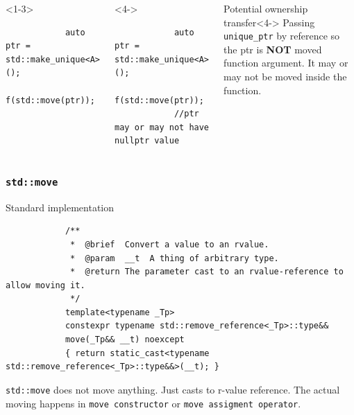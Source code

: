\documentclass{beamer}
\begin{document}
\begin{frame}[fragile,t]
\begin{columns}[T]
        \hrulefill
        \begin{onlyenv}<1-3>
        \begin{lstlisting}
            auto ptr = std::make_unique<A>();
            f(std::move(ptr));
		\end{lstlisting}
        \end{onlyenv}

        \begin{onlyenv}<4->
        \begin{lstlisting}
            auto ptr = std::make_unique<A>();
            f(std::move(ptr));
            //ptr may or may not have nullptr value
		\end{lstlisting}
        \end{onlyenv}

        \begin{block}{Potential ownership transfer}<4->
            Passing \texttt{unique\_ptr} by reference so the ptr is \textbf{NOT} moved function argument.
            It may or may not be moved inside the function.
        \end{block}
	\end{columns}


\end{frame}

\begin{frame}[fragile,t]
\frametitle{\texttt{std::move}}
    \begin{block}{Standard implementation}
        \begin{lstlisting}
            /**
             *  @brief  Convert a value to an rvalue.
             *  @param  __t  A thing of arbitrary type.
             *  @return The parameter cast to an rvalue-reference to allow moving it.
             */
            template<typename _Tp>
            constexpr typename std::remove_reference<_Tp>::type&&
            move(_Tp&& __t) noexcept
            { return static_cast<typename std::remove_reference<_Tp>::type&&>(__t); }
        \end{lstlisting}
    \end{block}
    
    \pause
    \texttt{std::move} does not move anything. Just casts to r-value reference. \newline \newline
    \pause
    The actual moving happens in \texttt{move constructor} or \texttt{move assigment operator}.
\end{frame}
\end{document}
